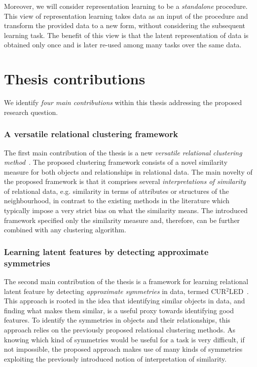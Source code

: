 Moreover, we will consider representation learning to be a \textit{standalone} procedure.
This view of representation learning takes data as an input of the procedure and transform the provided data to a new form, without considering the subsequent learning task.
The benefit of this view is that the latent representation of data is obtained only once and is later re-used among many tasks over the same data.







\section{Thesis contributions}




We identify \textit{four main contributions} within this thesis addressing the proposed research question.



\subsubsection{A versatile relational clustering framework}

The first main contribution of the thesis is a new \textit{versatile relational clustering method}~\cite{Dumancic2017a}.
The proposed clustering framework consists of a novel similarity measure for both objects and relationships in relational data.
The main novelty of the proposed framework is that it comprises several \textit{interpretations of similarity} of relational data, e.g. similarity in terms of attributes or structures of the neighbourhood, in contrast to the existing methods in the literature which typically impose a very strict bias on what the similarity means.
The introduced framework specified only the similarity measure and, therefore, can be further combined with any clustering algorithm.




\subsubsection{Learning latent features by detecting approximate symmetries}

The second main contribution of the thesis is a framework for learning relational latent feature by detecting \textit{approximate symmetries} in data, termed CUR$^2$LED~\cite{Dumancic2017}.
This approach is rooted in the idea that identifying similar objects in data, and finding what makes them similar, is a useful proxy towards identifying good features.
To identify the symmetries in objects and their relationships, this approach relies on the previously proposed relational clustering methods.
As knowing which kind of symmetries would be useful for a task is very difficult, if not impossible, the proposed approach makes use of many kinds of symmetries exploiting the previously introduced notion of interpretation of similarity.







